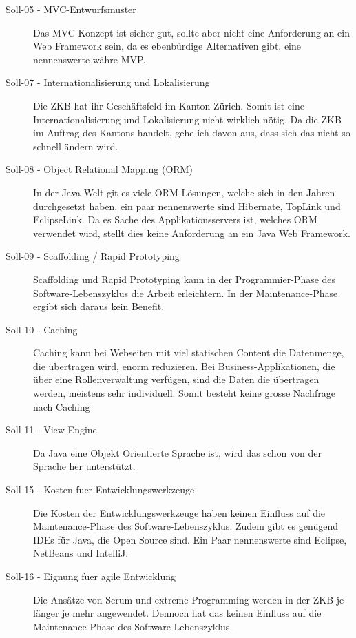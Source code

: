   \begin{description}
  \item[Soll-05 - MVC-Entwurfsmuster]
  Das \ac{MVC} Konzept ist sicher gut, sollte aber nicht eine Anforderung an ein
  Web Framework sein, da es ebenbürdige Alternativen gibt, eine nennenswerte währe
  \ac{MVP}.
  
  \item[Soll-07 - Internationalisierung und Lokalisierung]
  Die \ac{ZKB} hat ihr Geschäftsfeld im Kanton Zürich. Somit ist eine
  Internationalisierung und Lokalisierung nicht wirklich nötig. Da die \ac{ZKB}
  im Auftrag des Kantons handelt, gehe ich davon aus, dass sich das nicht so
  schnell ändern wird.
  
  \item[Soll-08 - Object Relational Mapping (ORM)]
  In der Java Welt git es viele \ac{ORM} Lösungen, welche sich in den Jahren
  durchgesetzt haben, ein paar nennenswerte sind Hibernate, TopLink und
  EclipseLink. Da es Sache des Applikationsservers ist, welches \ac{ORM}
  verwendet wird, stellt dies keine Anforderung an ein Java Web Framework.
  
  \item[Soll-09 - Scaffolding / Rapid Prototyping]
  Scaffolding und Rapid Prototyping kann in der Programmier-Phase des
  Software-Lebenszyklus die Arbeit erleichtern. In der Maintenance-Phase
  ergibt sich daraus kein Benefit.
  
  \item[Soll-10 - Caching]
  Caching kann bei Webseiten mit viel statischen Content die Datenmenge, die
  übertragen wird, enorm reduzieren. Bei Business-Applikationen, die über eine
  Rollenverwaltung verfügen, sind die Daten die übertragen werden, meistens sehr
  individuell. Somit besteht keine grosse Nachfrage nach Caching
  
  \item[Soll-11 - View-Engine]
  Da Java eine Objekt Orientierte Sprache ist, wird das schon von der Sprache
  her unterstützt.
  
  \item[Soll-15 - Kosten fuer Entwicklungswerkzeuge]
  Die Kosten der Entwicklungswerkzeuge haben keinen Einfluss auf die
  Maintenance-Phase des Software-Lebenszyklus. Zudem gibt es genügend \acp{IDE}
  für Java, die Open Source sind. Ein Paar nennenswerte sind Eclipse, NetBeans
  und IntelliJ.
  
  \item[Soll-16 - Eignung fuer agile Entwicklung]
  Die Ansätze von Scrum und extreme Programming werden in der \ac{ZKB} je länger
  je mehr angewendet. Dennoch hat das keinen Einfluss auf die Maintenance-Phase
  des Software-Lebenszyklus.
  \end{description}